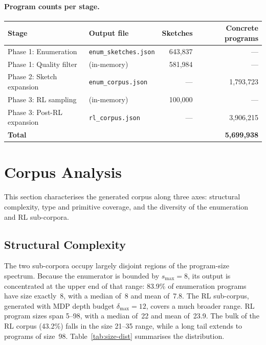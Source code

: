 \documentclass[11pt,a4paper]{article}
\begin{document}
\paragraph{Program counts per stage.}

\begin{center}
\begin{tabular}{llrr}
\toprule
Stage & Output file & Sketches & Concrete programs \\
\midrule
Phase 1: Enumeration          & \texttt{enum\_sketches.json}  & 643{,}837 & --- \\
Phase 1: Quality filter       & (in-memory)                   & 581{,}984 & --- \\
Phase 2: Sketch expansion     & \texttt{enum\_corpus.json}    & --- & 1{,}793{,}723 \\
Phase 3: RL sampling          & (in-memory)                   & 100{,}000 & --- \\
Phase 3: Post-RL expansion    & \texttt{rl\_corpus.json}      & --- & 3{,}906{,}215 \\
\midrule
\textbf{Total}                &                               & & \textbf{5{,}699{,}938} \\
\bottomrule
\end{tabular}
\end{center}

\appendix

\section{Corpus Analysis}\label{sec:analysis}

This section characterises the generated corpus along three axes: structural
complexity, type and primitive coverage, and the diversity of the
enumeration and RL sub-corpora.

\subsection{Structural Complexity}\label{sec:complexity}

The two sub-corpora occupy largely disjoint regions of the program-size
spectrum.  Because the enumerator is bounded by $s_{\max} = 8$, its output is
concentrated at the upper end of that range: 83.9\% of enumeration programs
have size exactly~8, with a median of~8 and mean of~7.8.  The RL sub-corpus,
generated with MDP depth budget $\delta_{\max} = 12$, covers a much broader
range.  RL program sizes span 5--98, with a median of~22 and mean of~23.9.
The bulk of the RL corpus (43.2\%) falls in the size 21--35 range, while a
long tail extends to programs of size~98.  Table~\ref{tab:size-dist}
summarises the distribution.
\end{document}
